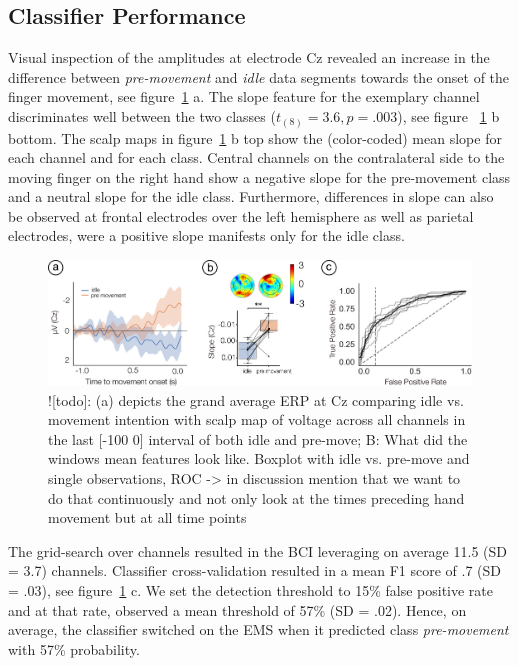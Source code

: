 \subsection{Classifier Performance}
Visual inspection of the amplitudes at electrode Cz revealed an increase in the difference between \textit{pre-movement} and \textit{idle} data segments towards the onset of the finger movement, see figure~\ref{fig:EEG_results} a. The slope feature for the exemplary channel discriminates well between the two classes (${t_{(8)}} = 3.6, p = .003$), see figure ~\ref{fig:EEG_results} b bottom. The scalp maps in figure~\ref{fig:EEG_results} b top show the (color-coded) mean slope for each channel and for each class. Central channels on the contralateral side to the moving finger on the right hand show a negative slope for the pre-movement class and a neutral slope for the idle class. Furthermore, differences in slope can also be observed at frontal electrodes over the left hemisphere as well as parietal electrodes, were a positive slope manifests only for the idle class. 

\begin{figure}
    \centering
    \includegraphics[width=\textwidth]{figures/EEG_results.pdf}
    \caption{![todo]: (a) depicts the grand average ERP at Cz comparing idle vs. movement intention with scalp map of voltage across all channels in the last [-100 0] interval of both idle and pre-move; B: What did the windows mean features look like. Boxplot with idle vs. pre-move and single observations, ROC -> in discussion mention that we want to do that continuously and not only look at the times preceding hand movement but at all time points}
    \label{fig:EEG_results}
\end{figure}

The grid-search over channels resulted in the BCI leveraging on average 11.5 (SD = 3.7) channels. Classifier cross-validation resulted in a mean F1 score of .7 (SD = .03), see figure~\ref{fig:EEG_results} c. We set the detection threshold to 15\% false positive rate and at that rate, observed a mean threshold of 57\% (SD = .02). Hence, on average, the classifier switched on the EMS when it predicted class \textit{pre-movement} with 57\% probability.

